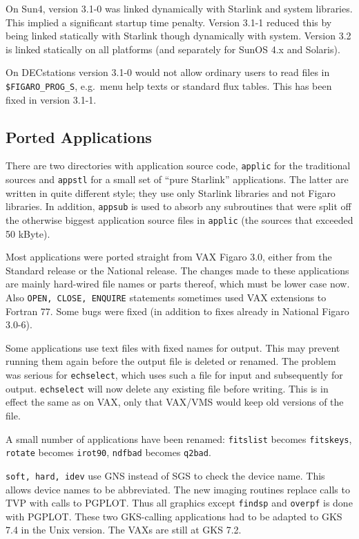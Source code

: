 On Sun4, version 3.1-0 was linked dynamically with Starlink and system
libraries.  This implied a significant startup time penalty.  Version
3.1-1 reduced this by being linked statically with Starlink though
dynamically with system.  Version 3.2 is linked statically on all
platforms (and separately for SunOS 4.x and Solaris).

On DECstations version 3.1-0 would not allow ordinary users to read
files in {\tt \$FIGARO\_PROG\_S}, e.g.\ menu help texts or standard flux
tables.  This has been fixed in version 3.1-1.


\subsection{Ported Applications}

There are two directories with application source code, {\tt applic} for
the traditional sources and {\tt appstl} for a small set of ``pure
Starlink'' applications.  The latter are written in quite different
style; they use only Starlink libraries and not Figaro libraries.  In
addition, {\tt appsub} is used to absorb any subroutines that were split
off the otherwise biggest application source files in {\tt applic} (the
sources that exceeded 50 kByte).

Most applications were ported straight from VAX Figaro 3.0, either from
the Standard release or the National release.
The changes made to these applications are mainly hard-wired file names or
parts thereof, which must be lower case now. Also {\tt OPEN, CLOSE,
ENQUIRE} statements sometimes used VAX extensions to Fortran 77. Some
bugs were fixed (in addition to fixes already in National Figaro 3.0-6).

Some applications use text files with fixed names for output.  This may
prevent running them again before the output file is deleted or renamed.
The problem was serious for {\tt echselect}, which uses such a file for
input and subsequently for output.  {\tt echselect} will now delete any
existing file before writing.  This is in effect the same as on VAX,
only that VAX/VMS would keep old versions of the file.

A small number of applications have been renamed: {\tt fitslist} becomes
{\tt fitskeys}, {\tt rotate} becomes {\tt irot90}, {\tt ndfbad} becomes
{\tt q2bad}.

{\tt soft, hard, idev} use GNS instead of SGS to check the device name.
This allows device names to be abbreviated.
The new imaging routines replace calls to TVP with calls to PGPLOT. Thus
all graphics except {\tt findsp} and {\tt overpf} is done with PGPLOT.
These two GKS-calling applications had to be
adapted to GKS 7.4 in the Unix version. The VAXs are still at GKS 7.2.

